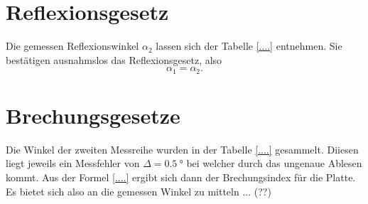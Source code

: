 \section{Reflexionsgesetz}
Die gemessen Reflexionswinkel $\alpha_2$ lassen sich der Tabelle \ref{....} entnehmen. Sie bestätigen ausnahmslos
das Reflexionsgesetz, also %
\begin{equation*}
    \alpha_1=\alpha_2.
\end{equation*}


\section{Brechungsgesetze}
Die Winkel der zweiten Messreihe wurden in der Tabelle \ref{....} gesammelt. Diiesen liegt jeweils ein Messfehler von
$\Delta = \SI{0.5}{\degree}$ bei welcher durch das ungenaue Ablesen kommt. Aus der Formel \eqref{....} ergibt sich dann 
der Brechungsindex für die Platte. Es bietet sich also an die gemessen Winkel zu mitteln ... (??)
